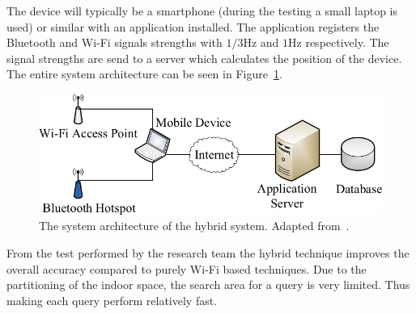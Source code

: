The device will typically be a smartphone (during the testing a small laptop is used) or similar with an application installed. 
The application registers the Bluetooth and Wi-Fi signals strengths with $1/3$Hz and $1$Hz respectively.  
The signal strengths are send to a server which calculates the position of the device. 
The entire system architecture can be seen in Figure~\ref{fig:hybridsystemarchitecture}.
\begin{figure}%
    \includegraphics[width=\columnwidth]{images/hybridsystemarchitecture.png}%
\caption{The system architecture of the hybrid system. Adapted from~\cite{6068444}.}%
\label{fig:hybridsystemarchitecture}%
\end{figure}

From the test performed by the research team the hybrid technique improves the overall accuracy compared to purely Wi-Fi based techniques.
Due to the partitioning of the indoor space, the search area for a query is very limited.
Thus making each query perform relatively fast. %
  
